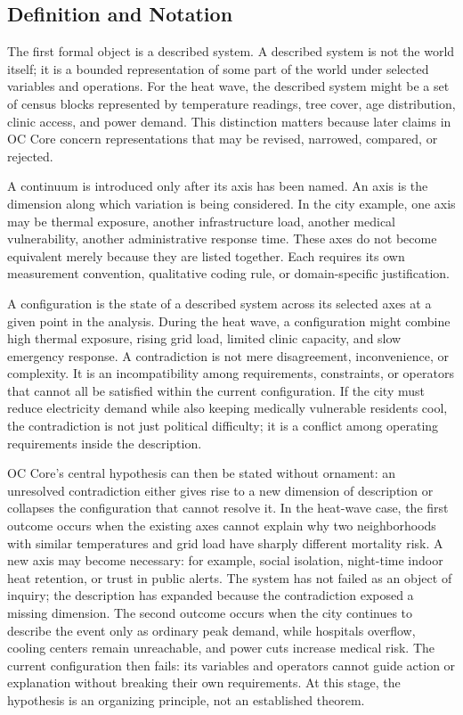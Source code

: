 \documentclass[11pt,a4paper,openany]{book}
\begin{document}
\subsection{Definition and Notation}
The first formal object is a described system. A described system is not the world itself; it is a bounded representation of some part of the world under selected variables and operations. For the heat wave, the described system might be a set of census blocks represented by temperature readings, tree cover, age distribution, clinic access, and power demand. This distinction matters because later claims in OC Core concern representations that may be revised, narrowed, compared, or rejected. \cite{kadanoff_scaling,wilson_renormalization}\par
A continuum is introduced only after its axis has been named. An axis is the dimension along which variation is being considered. In the city example, one axis may be thermal exposure, another infrastructure load, another medical vulnerability, another administrative response time. These axes do not become equivalent merely because they are listed together. Each requires its own measurement convention, qualitative coding rule, or domain-specific justification.\par
A configuration is the state of a described system across its selected axes at a given point in the analysis. During the heat wave, a configuration might combine high thermal exposure, rising grid load, limited clinic capacity, and slow emergency response. A contradiction is not mere disagreement, inconvenience, or complexity. It is an incompatibility among requirements, constraints, or operators that cannot all be satisfied within the current configuration. If the city must reduce electricity demand while also keeping medically vulnerable residents cool, the contradiction is not just political difficulty; it is a conflict among operating requirements inside the description.\par
OC Core's central hypothesis can then be stated without ornament: an unresolved contradiction either gives rise to a new dimension of description or collapses the configuration that cannot resolve it. In the heat-wave case, the first outcome occurs when the existing axes cannot explain why two neighborhoods with similar temperatures and grid load have sharply different mortality risk. A new axis may become necessary: for example, social isolation, night-time indoor heat retention, or trust in public alerts. The system has not failed as an object of inquiry; the description has expanded because the contradiction exposed a missing dimension. The second outcome occurs when the city continues to describe the event only as ordinary peak demand, while hospitals overflow, cooling centers remain unreachable, and power cuts increase medical risk. The current configuration then fails: its variables and operators cannot guide action or explanation without breaking their own requirements. At this stage, the hypothesis is an organizing principle, not an established theorem.\par
\end{document}
